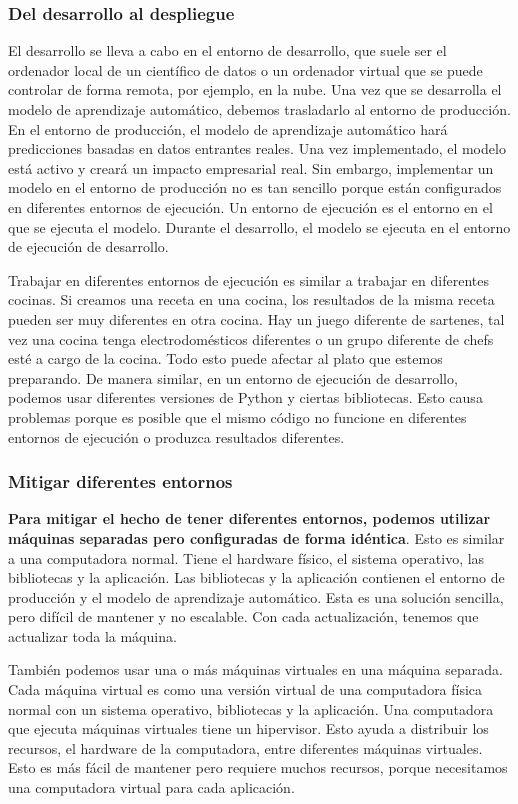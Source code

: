 \documentclass[10pt]{book}
\begin{document}
\subsubsection{Del desarrollo al despliegue}
El desarrollo se lleva a cabo en el entorno de desarrollo, que suele ser el ordenador local de un científico de datos o un ordenador virtual que se puede controlar de forma remota, por ejemplo, en la nube. Una vez que se desarrolla el modelo de aprendizaje automático, debemos trasladarlo al entorno de producción. En el entorno de producción, el modelo de aprendizaje automático hará predicciones basadas en datos entrantes reales. Una vez implementado, el modelo está activo y creará un impacto empresarial real. Sin embargo, implementar un modelo en el entorno de producción no es tan sencillo porque están configurados en diferentes entornos de ejecución. Un entorno de ejecución es el entorno en el que se ejecuta el modelo. Durante el desarrollo, el modelo se ejecuta en el entorno de ejecución de desarrollo.

Trabajar en diferentes entornos de ejecución es similar a trabajar en diferentes cocinas. Si creamos una receta en una cocina, los resultados de la misma receta pueden ser muy diferentes en otra cocina. Hay un juego diferente de sartenes, tal vez una cocina tenga electrodomésticos diferentes o un grupo diferente de chefs esté a cargo de la cocina. Todo esto puede afectar al plato que estemos preparando. De manera similar, en un entorno de ejecución de desarrollo, podemos usar diferentes versiones de Python y ciertas bibliotecas. Esto causa problemas porque es posible que el mismo código no funcione en diferentes entornos de ejecución o produzca resultados diferentes.

\subsubsection{Mitigar diferentes entornos}
\textbf{Para mitigar el hecho de tener diferentes entornos, podemos utilizar máquinas separadas pero configuradas de forma idéntica}. Esto es similar a una computadora normal. Tiene el hardware físico, el sistema operativo, las bibliotecas y la aplicación. Las bibliotecas y la aplicación contienen el entorno de producción y el modelo de aprendizaje automático. Esta es una solución sencilla, pero difícil de mantener y no escalable. Con cada actualización, tenemos que actualizar toda la máquina.

También podemos usar una o más máquinas virtuales en una máquina separada. Cada máquina virtual es como una versión virtual de una computadora física normal con un sistema operativo, bibliotecas y la aplicación. Una computadora que ejecuta máquinas virtuales tiene un hipervisor. Esto ayuda a distribuir los recursos, el hardware de la computadora, entre diferentes máquinas virtuales. Esto es más fácil de mantener pero requiere muchos recursos, porque necesitamos una computadora virtual para cada aplicación.
\end{document}
